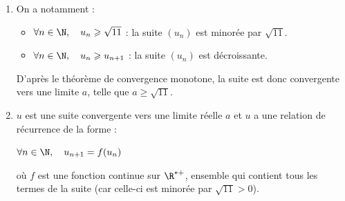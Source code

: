 \begin{enumerate}
\emph{Initialisation :} Pour $n = 0$, on a $u_n = 5$ et $u_{n+1} = u_1 = \dfrac{18}{5} = 3,6$ et par ailleurs, on a $\sqrt{11}\approx 3,32$ donc on a bien $u_0\geqslant u_1 \geqslant\sqrt{11}$. L'inégalité est vraie à l'indice 0.

		\emph{Hérédité :} Pour un entier naturel $n$ quelconque fixé, on suppose que l'inégalité est vraie pour l'indice $n$, c'est-à-dire que l'on a : $ u_{n} \geqslant u_{n+1} \geqslant \sqrt{11}$.

		 $\begin{aligned} u_{n} \geqslant u_{n+1} \geqslant \sqrt{11}
		 	&\implies f(u_n) \geqslant f(u_{n+1}) \geqslant f\left(\sqrt{11}\right) \qquad \text{car  }f\text{ est croissante sur }\left[\sqrt{11}~;~+\infty \right[\\
		 	&\implies u_{n+1}\geqslant u_{n+2} \geqslant \sqrt{11} \qquad \text{grâce aux éléments de la remarque}\\ \end{aligned}$

\emph{Conclusion :} On a montré que l'inégalité est vraie pour l'indice 0, et que, pour tout entier naturel $n$ la véracité est héréditaire de l'indice $n$ à l'indice $(n+1)$. En vertu du principe de récurrence, on peut en déduire que :

Pour tout $n$ naturel, on a : $u_{n} \geqslant u_{n+1} \geqslant \sqrt{11}$.

\item On a notamment :
\begin{itemize}
\item $\forall n \in \N, \quad u_n\geqslant \sqrt{11}$ : la suite $(u_n)$ est minorée par $\sqrt{11}$.

\item $\forall n \in \N, \quad u_n\geqslant u_{n+1}$ : la suite $(u_n)$ est décroissante.
\end{itemize}

D'après le théorème de convergence monotone, la suite est donc convergente vers une limite $a$, telle que $a \geqslant\sqrt{11}$.

	\item $u$ est une suite convergente vers une limite réelle $a$ et $u$ a une relation de récurrence de la forme :

$\forall n \in \N, \quad u_{n+1}=f(u_n)$

où $f$ est une fonction continue sur $\R^{*+}$, ensemble qui contient tous les termes de la suite (car celle-ci est minorée par $\sqrt{11}>0$).


\end{enumerate}
